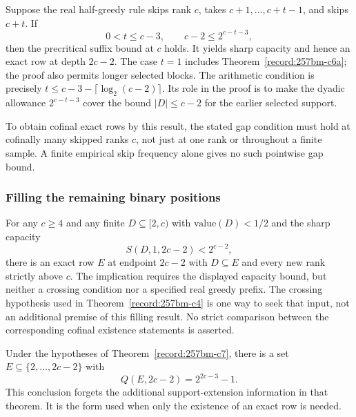 \begin{thm}\label{record:257bm-c6b}
Suppose the real half-greedy rule skips rank $c$, takes
$c+1,\ldots,c+t-1$, and skips $c+t$.  If
\[
 0<t\le c-3,\qquad c-2\le2^{c-t-3},
\]
then the precritical suffix bound at $c$ holds.  It yields sharp
capacity and hence an exact row at depth $2c-2$.
The case $t=1$ includes Theorem~\ref{record:257bm-c6a}; the proof
also permits longer selected blocks.  The arithmetic condition is
precisely $t\le c-3-\lceil\log_2(c-2)\rceil$.
Its role in the proof is to make the dyadic allowance $2^{c-t-3}$
cover the bound $|D|\le c-2$ for the earlier selected support.

To obtain cofinal exact rows by this result, the stated gap condition
must hold at cofinally many skipped ranks $c$, not just at one rank
or throughout a finite sample.  A finite empirical skip frequency
alone gives no such pointwise gap bound.
\end{thm}

\subsubsection*{Filling the remaining binary positions}

\begin{thm}\label{record:257bm-c7}
For any $c\ge4$ and any finite $D\subseteq[2,c)$ with $\mathrm{value}(D)<1/2$ and the sharp
capacity
\[
\ensuremath{S}(D,1,2c-2) < 2^{c-2},
\]
there is an exact row $E$ at endpoint $2c-2$ with $D\subseteq E$ and every new rank strictly
above $c$. The implication requires the displayed capacity bound,
but neither a crossing condition nor a specified real greedy prefix.
The crossing hypothesis used in Theorem~\ref{record:257bm-c4} is
one way to seek that input, not an additional premise of this filling
result.  No strict comparison between the corresponding cofinal
existence statements is asserted.
\end{thm}

\begin{thm}\label{record:257bm-c8}
Under the hypotheses of Theorem~\ref{record:257bm-c7}, there is a
set $E\subseteq\{2,\ldots,2c-2\}$ with
\[
 Q(E,2c-2)=2^{2c-3}-1.
\]
This conclusion forgets the additional support-extension information
in that theorem.  It is the form used when only the existence of an
exact row is needed.
\end{thm}

